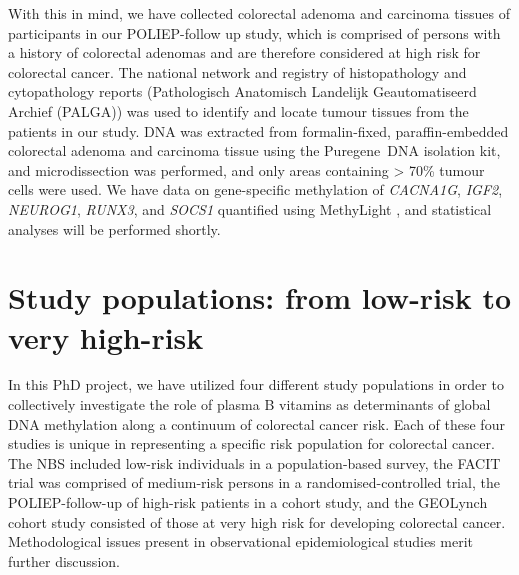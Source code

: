 \noindent With this in mind, we have collected colorectal adenoma and carcinoma tissues of participants in our POLIEP-follow up study, which is comprised of persons with a history of colorectal adenomas and are therefore considered at high risk for colorectal cancer. The national network and registry of histopathology and cytopathology reports (Pathologisch Anatomisch Landelijk Geautomatiseerd Archief (PALGA)) \cite{c762} was used to identify and locate tumour tissues from the patients in our study. DNA was extracted from formalin-fixed, paraffin-embedded colorectal adenoma and carcinoma tissue using the Puregene\texttrademark~DNA isolation kit, and microdissection was performed, and only areas containing > 70\% tumour cells were used. We have data on gene-specific methylation of \emph{CACNA1G}, \emph{IGF2}, \emph{NEUROG1}, \emph{RUNX3}, and \emph{SOCS1} quantified using MethyLight \cite{c763}, and statistical analyses will be performed shortly. 
 
\section[]{Study populations: from low-risk to very high-risk} %
\noindent In this PhD project, we have utilized four different study populations in order to collectively investigate the role of plasma B vitamins as determinants of global DNA methylation along a continuum of colorectal cancer risk. Each of these four studies is unique in representing a specific risk population for colorectal cancer. The NBS included low-risk individuals in a population-based survey, the FACIT trial was comprised of medium-risk persons in a randomised-controlled trial, the POLIEP-follow-up of high-risk patients in a cohort study, and the GEOLynch cohort study consisted of those at very high risk for developing colorectal cancer. Methodological issues present in observational epidemiological studies merit further discussion. 
 
